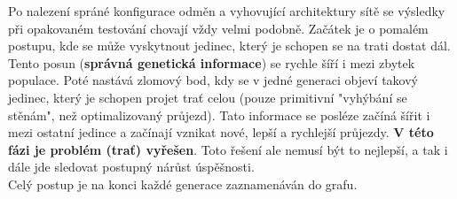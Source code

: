 \documentclass[a4paper,12pt]{article}
\begin{document}
            Po nalezení spráné konfigurace odměn a vyhovující architektury sítě
            se výsledky při opakovaném testování chovají vždy velmi podobně.
            Začátek je o pomalém postupu, kde se může vyskytnout jedinec, který
            je schopen se na trati dostat dál. Tento posun (\textbf{správná genetická informace})
            se rychle šíří i mezi zbytek populace. Poté nastává zlomový bod, kdy se
            v jedné generaci objeví takový jedinec, který je schopen projet trať celou
            (pouze primitivní "vyhýbání se stěnám", než optimalizovaný průjezd). 
            Tato informace se posléze začíná šířit i mezi ostatní jedince a začínají vznikat nové,
            lepší a rychlejší průjezdy. \textbf{V této fázi je problém (trať) vyřešen}.
            Toto řešení ale nemusí být to nejlepší, a tak i dále jde sledovat postupný nárůst
            úspěšnosti.\\
            Celý postup je na konci každé generace zaznamenáván do grafu.
\end{document}
